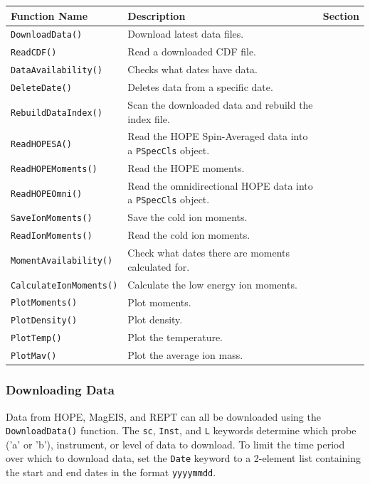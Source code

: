 	\begin{tabular}{|l|l|l|}
	\hline
	Function Name & Description & Section \\
	\hline
	\texttt{DownloadData()} & Download latest data files. & \\
	\texttt{ReadCDF()} & Read a downloaded CDF file. & \\
	\texttt{DataAvailability()} & Checks what dates have data. & \\
	\texttt{DeleteDate()} & Deletes data from a specific date. & \\
	\texttt{RebuildDataIndex()} & Scan the downloaded data and rebuild the index file. & \\
	\texttt{ReadHOPESA()} & Read the HOPE Spin-Averaged data into a \texttt{PSpecCls} object. & \\
	\texttt{ReadHOPEMoments()} & Read the HOPE moments. & \\
	\texttt{ReadHOPEOmni()} & Read the omnidirectional HOPE data into a \texttt{PSpecCls} object. & \\
	\texttt{SaveIonMoments()} & Save the cold ion moments. & \\
	\texttt{ReadIonMoments()} & Read the cold ion moments. & \\
	\texttt{MomentAvailability()} & Check what dates there are moments calculated for. & \\
	\texttt{CalculateIonMoments()} & Calculate the low energy ion moments. & \\
	\texttt{PlotMoments()} & Plot moments. & \\
	\texttt{PlotDensity()} & Plot density. & \\
	\texttt{PlotTemp()} & Plot the temperature. & \\
	\texttt{PlotMav()} & Plot the average ion mass. & \\
	\hline
	\end{tabular}
	
	\subsubsection{Downloading Data}
	
	Data from HOPE, MagEIS, and REPT can all be downloaded using the \texttt{DownloadData()} function. The \texttt{sc}, \texttt{Inst}, and \texttt{L} keywords determine which probe ('a' or 'b'), instrument, or level of data to download. To limit the time period over which to download data, set the \texttt{Date} keyword to a 2-element list containing the start and end dates in the format \texttt{yyyymmdd}.
	
